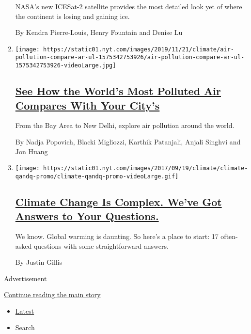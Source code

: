 \begin{enumerate}
  NASA's new ICESat-2 satellite provides the most detailed look yet of
  where the continent is losing and gaining ice.

  By Kendra Pierre-Louis, Henry Fountain and Denise Lu
\item
  \texttt{[image: https://static01.nyt.com/images/2019/11/21/climate/air-pollution-compare-ar-ul-1575342753926/air-pollution-compare-ar-ul-1575342753926-videoLarge.jpg]}

  \hypertarget{see-how-the-worlds-most-polluted-air-compares-with-your-citys}{%
  \subsection{\texorpdfstring{\href{/interactive/2019/12/02/climate/air-pollution-compare-ar-ul.html}{See
  How the World's Most Polluted Air Compares With Your
  City's}}{See How the World's Most Polluted Air Compares With Your City's}}\label{see-how-the-worlds-most-polluted-air-compares-with-your-citys}}

  From the Bay Area to New Delhi, explore air pollution around the
  world.

  By Nadja Popovich, Blacki Migliozzi, Karthik Patanjali, Anjali Singhvi
  and Jon Huang
\item
  \texttt{[image: https://static01.nyt.com/images/2017/09/19/climate/climate-qandq-promo/climate-qandq-promo-videoLarge.gif]}

  \hypertarget{climate-change-is-complex-weve-got-answers-to-your-questions}{%
  \subsection{\texorpdfstring{\href{/interactive/2017/climate/what-is-climate-change.html}{Climate
  Change Is Complex. We've Got Answers to Your
  Questions.}}{Climate Change Is Complex. We've Got Answers to Your Questions.}}\label{climate-change-is-complex-weve-got-answers-to-your-questions}}

  We know. Global warming is daunting. So here's a place to start: 17
  often-asked questions with some straightforward answers.

  By Justin Gillis
\end{enumerate}

Advertisement

\protect\hyperlink{after-mid1}{Continue reading the main story}

\begin{itemize}
\tightlist
\item
  \protect\hyperlink{stream-panel}{Latest}
\item
  Search
\end{itemize}

